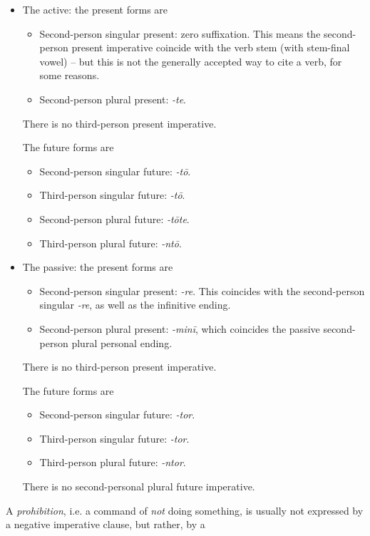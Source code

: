 \documentclass{article}
\newcommand*{\corpus}[1]{\emph{#1}}
\begin{document}
\begin{itemize}
    \item The active:
    the present forms are
    \begin{itemize}
        \item Second-person singular present: zero suffixation. 
        This means the second-person present imperative coincide with the verb stem 
        (with stem-final vowel)
        -- but this is not the generally accepted way to cite a verb, for some reasons.
        \item Second-person plural present: \corpus{-te}.
    \end{itemize}
    There is no third-person present imperative.

    The future forms are
    \begin{itemize}
        \item Second-person singular future: \corpus{-t\={o}}.
        \item Third-person singular future: \corpus{-t\={o}}.
        \item Second-person plural future: \corpus{-t\={o}te}.
        \item Third-person plural future: \corpus{-nt\={o}}.
    \end{itemize}
    \item The passive: 
    the present forms are
    \begin{itemize}
        \item Second-person singular present: \corpus{-re}. 
        This coincides with the second-person singular \corpus{-re},
        as well as the infinitive ending.
        \item Second-person plural present: \corpus{-minī}, 
        which coincides the passive second-person plural personal ending.
    \end{itemize}
    There is no third-person present imperative.

    The future forms are
    \begin{itemize}
        \item Second-person singular future: \corpus{-tor}.
        \item Third-person singular future: \corpus{-tor}.
        \item Third-person plural future: \corpus{-ntor}.
    \end{itemize}
    There is no second-personal plural future imperative.
\end{itemize}

A \emph{prohibition}, i.e. a command of \emph{not} doing something,
is usually not expressed by a negative imperative clause,
but rather, by a %
\end{document}
